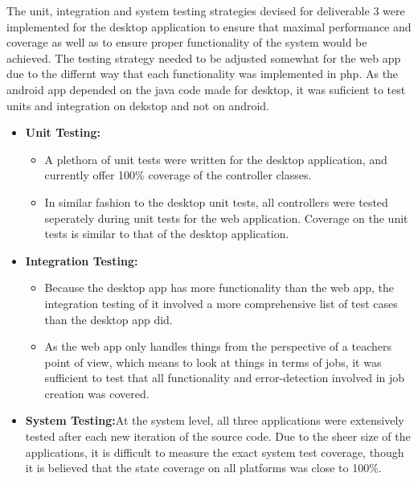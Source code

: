 \documentclass[12pt]{article}
\begin{document}
The unit, integration and system testing strategies devised for deliverable 3 were implemented for the desktop application to ensure that maximal performance and coverage as well as  to ensure proper functionality of the system would be achieved. The testing strategy needed to be adjusted somewhat for the web app due to the differnt way that each functionality was implemented in php. As the android app depended on the java code made for desktop, it was suficient to test units and integration on dekstop and not on android.
\begin{itemize}
		\item \textbf{Unit Testing:} 
		\begin{itemize}
			\item A plethora of unit tests were written for the desktop application, and currently offer 100\% coverage of the controller classes.
			\item  In similar fashion to the desktop unit tests, all controllers were tested seperately during unit tests for the web application. Coverage on the unit tests is similar to that of the desktop application.
		\end{itemize}
			\item \textbf{Integration Testing:} 
		\begin{itemize}
			\item Because the desktop app has more functionality than the web app, the integration testing of it involved a more comprehensive list of test cases than the desktop app did.
			\item As the web app only handles things from the perspective of a teachers point of view, which means to look at things in terms of jobs, it was sufficient to test that all functionality and error-detection involved in job creation was covered.
		\end{itemize}
	\item \textbf{System Testing:}At the system level, all three applications were extensively tested after each new iteration of the source code. Due to the sheer size of the applications, it is difficult to measure the exact system test coverage, though it is believed that the state coverage on all platforms was close to 100\%.
\end{itemize}
\end{document}
